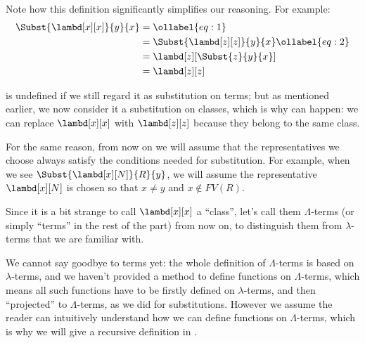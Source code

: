\documentclass[../../../include/open-logic-section]{subfiles}
\begin{document}
Note how this definition significantly simplifies our reasoning. For
example:
\begin{align}
  \Subst{\lambd[x][x]}{y}{x} & =\ollabel{eq:1}\\
  &= \Subst{\lambd[z][z]}{y}{x} \ollabel{eq:2}\\
  &= \lambd[z][\Subst{z}{y}{x}] \\
  &= \lambd[z][z]
\end{align}

 is undefined if we still regard it as substitution on
terms; but as mentioned earlier, we now consider it a substitution on
classes, which is why  can happen: we can replace
$\lambd[x][x]$ with $\lambd[z][z]$ because they belong to the same
class.

For the same reason, from now on we will assume that the
representatives we choose always satisfy the conditions needed for
substitution. For example, when we see $\Subst{\lambd[x][N]}{R}{y}$,
we will assume the representative $\lambd[x][N]$ is chosen so that
$x \neq y$ and $x \notin FV(R)$.

Since it is a bit strange to call $\lambd[x][x]$ a ``class'', let's
call them $\Lambda$-terms (or simply ``terms'' in the rest of the
part) from now on, to distinguish them from $\lambda$-terms that we
are familiar with.

\begin{editorial}
  We cannot say goodbye to terms yet: the whole definition of
  $\Lambda$-terms is based on $\lambda$-terms, and we haven't provided
  a method to define functions on $\Lambda$-terms, which means all
  such functions have to be firstly defined  on $\lambda$-terms, and
  then ``projected'' to $\Lambda$-terms, as we did for substitutions.
  However we assume the reader can intuitively understand how we can
  define functions on $\Lambda$-terms, which is why we will give a
  recursive definition in .
\end{editorial}
\end{document}
